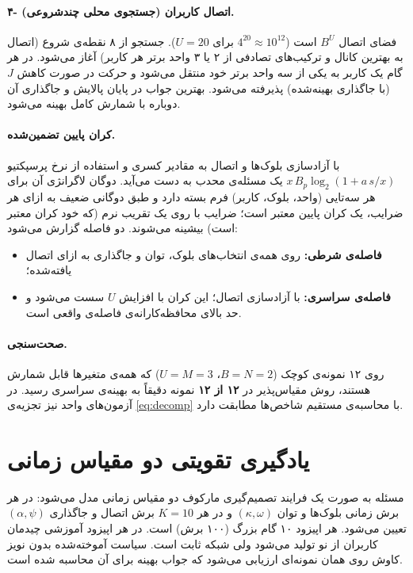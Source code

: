 \documentclass[12pt,oneside]{report}
\begin{document}
\paragraph{۴- اتصال کاربران (جستجوی محلی چندشروعی).}
فضای اتصال $B^U$ است ($4^{20}\approx10^{12}$ برای $U=20$). جستجو از ۸ نقطه‌ی شروع (اتصال به بهترین کانال و ترکیب‌های تصادفی از ۲ یا ۳ واحد برتر هر کاربر) آغاز می‌شود. در هر گام یک کاربر به یکی از سه واحد برتر خود منتقل می‌شود و حرکت در صورت کاهش $J$ (با جاگذاری بهینه‌شده) پذیرفته می‌شود. بهترین جواب در پایان پالایش و جاگذاری آن دوباره با شمارش کامل بهینه می‌شود.

\paragraph{کران پایین تضمین‌شده.}
با آزادسازی بلوک‌ها و اتصال به مقادیر کسری و استفاده از نرخ پرسپکتیو $x\,B_p\log_2(1+a\,s/x)$ یک مسئله‌ی محدب به دست می‌آید. دوگان لاگرانژی آن برای هر سه‌تایی (واحد، بلوک، کاربر) فرم بسته دارد و طبق دوگانی ضعیف به ازای هر ضرایب، یک کران پایین معتبر است؛ ضرایب با  روی یک تقریب نرم (که خود کران معتبر است) بیشینه می‌شوند. دو فاصله گزارش می‌شود:
\begin{itemize}
	\item \textbf{فاصله‌ی شرطی:} روی همه‌ی انتخاب‌های بلوک، توان و جاگذاری به ازای اتصال یافته‌شده؛
	\item \textbf{فاصله‌ی سراسری:} با آزادسازی اتصال؛ این کران با افزایش $U$ سست می‌شود و حد بالای محافظه‌کارانه‌ی فاصله‌ی واقعی است.
\end{itemize}

\paragraph{صحت‌سنجی.}
روی ۱۲ نمونه‌ی کوچک ($B=N=2$، $U=M=3$) که همه‌ی متغیرها قابل شمارش هستند، روش مقیاس‌پذیر در \textbf{۱۲ از ۱۲} نمونه دقیقاً به بهینه‌ی سراسری رسید. در آزمون‌های واحد نیز تجزیه‌ی \eqref{eq:decomp} با محاسبه‌ی مستقیم شاخص‌ها مطابقت دارد.

\section{یادگیری تقویتی دو مقیاس زمانی}\label{sec:rl}
مسئله به صورت یک فرایند تصمیم‌گیری مارکوف دو مقیاس زمانی مدل می‌شود: در هر برش زمانی بلوک‌ها و توان $(\kappa,\omega)$ و در هر $K=10$ برش اتصال و جاگذاری $(\alpha,\psi)$ تعیین می‌شود. هر اپیزود ۱۰ گام بزرگ (۱۰۰ برش) است. در هر اپیزود آموزشی چیدمان کاربران از نو تولید می‌شود ولی شبکه ثابت است. سیاست آموخته‌شده بدون نویز کاوش روی همان نمونه‌ای ارزیابی می‌شود که جواب بهینه برای آن محاسبه شده است.
\end{document}
